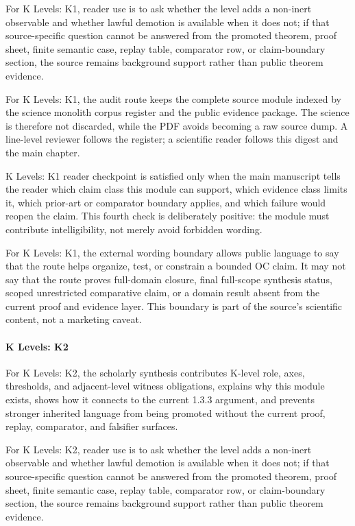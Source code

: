 For K Levels: K1, reader use is to ask whether the level adds a non-inert observable and whether lawful demotion is available when it does not; if that source-specific question cannot be answered from the promoted theorem, proof sheet, finite semantic case, replay table, comparator row, or claim-boundary section, the source remains background support rather than public theorem evidence.


For K Levels: K1, the audit route keeps the complete source module indexed by the science monolith corpus register and the public evidence package. The science is therefore not discarded, while the PDF avoids becoming a raw source dump. A line-level reviewer follows the register; a scientific reader follows this digest and the main chapter.


K Levels: K1 reader checkpoint is satisfied only when the main manuscript tells the reader which claim class this module can support, which evidence class limits it, which prior-art or comparator boundary applies, and which failure would reopen the claim. This fourth check is deliberately positive: the module must contribute intelligibility, not merely avoid forbidden wording.


For K Levels: K1, the external wording boundary allows public language to say that the route helps organize, test, or constrain a bounded OC claim. It may not say that the route proves full-domain closure, final full-scope synthesis status, scoped unrestricted comparative claim, or a domain result absent from the current proof and evidence layer. This boundary is part of the source's scientific content, not a marketing caveat.


\paragraph{K Levels: K2}

For K Levels: K2, the scholarly synthesis contributes K-level role, axes, thresholds, and adjacent-level witness obligations, explains why this module exists, shows how it connects to the current 1.3.3 argument, and prevents stronger inherited language from being promoted without the current proof, replay, comparator, and falsifier surfaces.


For K Levels: K2, reader use is to ask whether the level adds a non-inert observable and whether lawful demotion is available when it does not; if that source-specific question cannot be answered from the promoted theorem, proof sheet, finite semantic case, replay table, comparator row, or claim-boundary section, the source remains background support rather than public theorem evidence.


